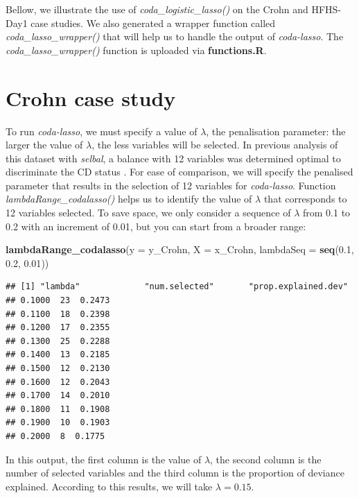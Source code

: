 \documentclass[openany]{book}
\newenvironment{Shaded}{\begin{snugshade}}{\end{snugshade}}
\newcommand{\KeywordTok}[1]{\textcolor[rgb]{0.13,0.29,0.53}{\textbf{#1}}}
\newcommand{\DataTypeTok}[1]{\textcolor[rgb]{0.13,0.29,0.53}{#1}}
\newcommand{\FloatTok}[1]{\textcolor[rgb]{0.00,0.00,0.81}{#1}}
\newcommand{\NormalTok}[1]{#1}
\begin{document}
Bellow, we illustrate the use of \emph{coda\_logistic\_lasso()} on the
Crohn and HFHS-Day1 case studies. We also generated a wrapper function
called \emph{coda\_lasso\_wrapper()} that will help us to handle the
output of \emph{coda-lasso}. The \emph{coda\_lasso\_wrapper()} function
is uploaded via \textbf{functions.R}.

\section{Crohn case study}\label{crohn-case-study-2}

To run \emph{coda-lasso}, we must specify a value of \(\lambda\), the
penalisation parameter: the larger the value of \(\lambda\), the less
variables will be selected. In previous analysis of this dataset with
\emph{selbal}, a balance with 12 variables was determined optimal to
discriminate the CD status \citep{rivera2018balances}. For ease of
comparison, we will specify the penalised parameter that results in the
selection of 12 variables for \emph{coda-lasso}. Function
\emph{lambdaRange\_codalasso()} helps us to identify the value of
\(\lambda\) that corresponds to 12 variables selected. To save space, we
only consider a sequence of \(\lambda\) from 0.1 to 0.2 with an
increment of 0.01, but you can start from a broader range:

\begin{Shaded}
\begin{Highlighting}[]
\KeywordTok{lambdaRange_codalasso}\NormalTok{(}\DataTypeTok{y =}\NormalTok{ y_Crohn, }\DataTypeTok{X =}\NormalTok{ x_Crohn, }\DataTypeTok{lambdaSeq =} \KeywordTok{seq}\NormalTok{(}\FloatTok{0.1}\NormalTok{, }\FloatTok{0.2}\NormalTok{, }\FloatTok{0.01}\NormalTok{))}
\end{Highlighting}
\end{Shaded}

\begin{verbatim}
## [1] "lambda"             "num.selected"       "prop.explained.dev"
## 0.1000  23  0.2473
## 0.1100  18  0.2398
## 0.1200  17  0.2355
## 0.1300  25  0.2288
## 0.1400  13  0.2185
## 0.1500  12  0.2130
## 0.1600  12  0.2043
## 0.1700  14  0.2010
## 0.1800  11  0.1908
## 0.1900  10  0.1903
## 0.2000  8  0.1775
\end{verbatim}

In this output, the first column is the value of \(\lambda\), the second
column is the number of selected variables and the third column is the
proportion of deviance explained. According to this results, we will
take \(\lambda = 0.15\).
\end{document}
